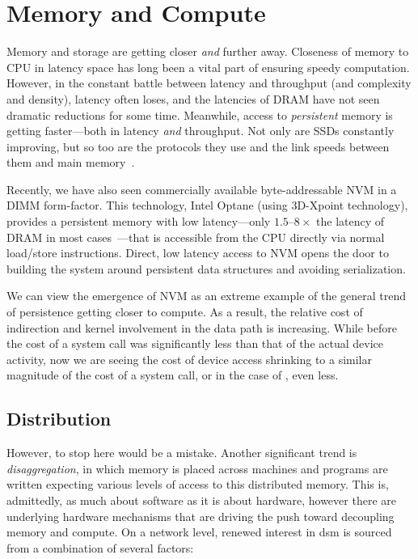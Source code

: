 \section{Memory and Compute}

Memory and storage are getting closer \emph{and} further away. Closeness of memory to CPU in latency space has long been a vital part of ensuring speedy
computation. However, in the constant battle between latency and throughput (and complexity and density), latency often
loses, and the latencies of DRAM have not seen dramatic reductions
for some time. Meanwhile, access to \emph{persistent} memory is getting faster---both in latency \emph{and} throughput.
Not only are SSDs constantly improving, but so too are the protocols they use and the link speeds between them and main
memory~\cite{xu:systor15,lee:atc19}.

Recently, we have also seen commercially available byte-addressable NVM
in a DIMM form-factor. This technology, Intel Optane (using 3D-Xpoint technology), provides a persistent memory
with low latency---only $1.5$--$8\times$ the latency of DRAM in most cases~\cite{ucsd_bnvm}---that is accessible from the CPU directly via normal load/store instructions. Direct, low latency
access to NVM opens the door to building the system around persistent data structures and avoiding serialization.

We can view the emergence of NVM as an extreme example of the general trend of persistence getting closer to compute. As a result, the relative cost of indirection and kernel involvement in
the data path is increasing. While before the cost of a system call was significantly less than that of the actual device activity, now we are seeing the cost of device access shrinking to a
similar magnitude of the cost of a system call, or in the case of \NVM, even less.

\subsection{Distribution}

However, to stop here would be a mistake. Another significant trend is \emph{disaggregation}, in which memory is placed across machines and programs are written expecting various levels of
access to this distributed memory. This is, admittedly, as much about software as it is about hardware, however there are underlying hardware mechanisms that are driving the push toward
decoupling memory and compute. On a network level, renewed interest in \ac{dsm} is sourced from a combination of several factors:


